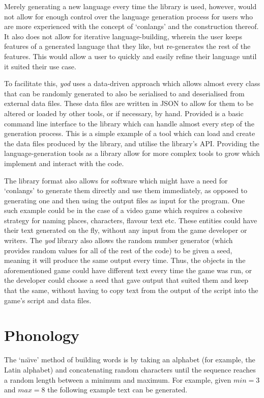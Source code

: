 \documentclass{report}
\begin{document}
   Merely generating a new language every time the library is used, however, would not allow for enough control over the language generation process for users who are more experienced with the concept of `conlangs' and the construction thereof. It also does not allow for iterative language-building, wherein the user keeps features of a generated language that they like, but re-generates the rest of the features. This would allow a user to quickly and easily refine their language until it suited their use case.
   
   To facilitate this, \textit{yod} uses a data-driven approach which allows almost every class that can be randomly generated to also be serialised to and deserialised from external data files. These data files are written in JSON to allow for them to be altered or loaded by other tools, or if necessary, by hand. Provided is a basic command line interface to the library which can handle almost every step of the generation process. This is a simple example of a tool which can load and create the data files produced by the library, and utilise the library's API. Providing the language-generation tools as a library allow for more complex tools to grow which implement and interact with the code.
   
   The library format also allows for software which might have a need for `conlangs' to generate them directly and use them immediately, as opposed to generating one and then using the output files as input for the program. One such example could be in the case of a video game which requires a cohesive strategy for naming places, characters, flavour text etc. These entities could have their text generated on the fly, without any input from the game developer or writers. The \textit{yod} library also allows the random number generator (which provides random values for all of the rest of the code) to be given a seed, meaning it will produce the same output every time. Thus, the objects in the aforementioned game could have different text every time the game was run, or the developer could choose a seed that gave output that suited them and keep that the same, without having to copy text from the output of the script into the game's script and data files.
   
   
   \chapter{Phonology}
   \label{chapter: phonology}
   The `na\"{\i}ve' method of building words is by taking an alphabet (for example, the Latin alphabet) and concatenating random characters until the sequence reaches a random length between a minimum and maximum. For example, given $min = 3$ and $max = 8$ the following example text can be generated.
   
\end{document}
